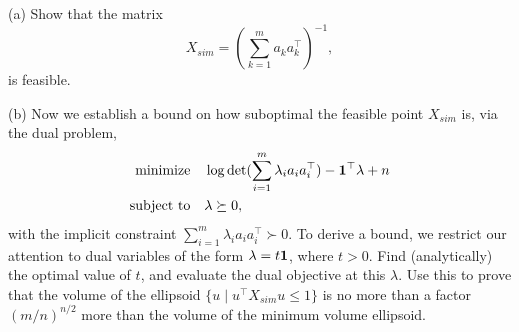 \documentclass[11pt]{article}
\newcommand{\T}{^\top}
\begin{document}
(a) Show that the matrix
\[
X_{sim} = \left(\sum_{k=1}^{m}a_ka_k\T\right)^{-1},
\]
is feasible.

(b) Now we establish a bound on how suboptimal the feasible point $X_{sim}$ is, via the dual
problem,
\begin{align*}
  \text{minimize}\quad& \log\det(\sum_{i=1}^{m} \lambda_i a_i a_i\T) - \ones\T \lambda + n\\
  \text{subject to}\quad & \lambda \succeq 0,
\end{align*}
with the implicit constraint $\sum_{i=1}^{m} \lambda_i a_i a_i\T \succ 0$.
To derive a bound, we restrict our attention to dual variables of the form $\lambda = t\mathbf 1$, where $t > 0$. Find (analytically) the optimal value of $t$, and evaluate the dual objective at this $\lambda$. Use this to prove that the volume of the ellipsoid $\{u\mid u\T X_{sim}u\leq 1\}$ is no more than a factor $(m/n)^{n/2}$ more than the volume of the minimum volume ellipsoid.
\end{document}
